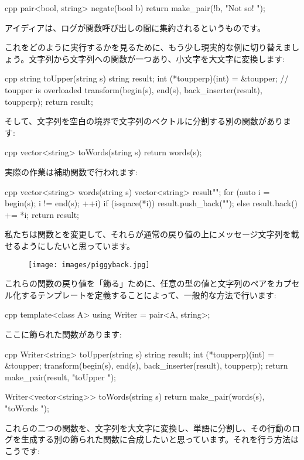 \begin{snip}{cpp}
pair<bool, string> negate(bool b) {
    return make_pair(!b, "Not so! ");
}
\end{snip}
アイディアは、ログが関数呼び出しの間に集約されるというものです。

これをどのように実行するかを見るために、もう少し現実的な例に切り替えましょう。文字列から文字列への関数が一つあり、小文字を大文字に変換します:

\begin{snip}{cpp}
string toUpper(string s) {
    string result;
    int (*toupperp)(int) = &toupper; // toupper is overloaded
    transform(begin(s), end(s), back_inserter(result), toupperp);
    return result;
}
\end{snip}
そして、文字列を空白の境界で文字列のベクトルに分割する別の関数があります:

\begin{snip}{cpp}
vector<string> toWords(string s) {
    return words(s);
}
\end{snip}
実際の作業は補助関数で行われます:

\begin{snip}{cpp}
vector<string> words(string s) {
    vector<string> result{""};
    for (auto i = begin(s); i != end(s); ++i)
    {
        if (isspace(*i))
            result.push_back(""); 
        else
            result.back() += *i;
    }
    return result;
}
\end{snip}
私たちは関数とを変更して、それらが通常の戻り値の上にメッセージ文字列を載せるようにしたいと思っています。

\begin{figure}[H]
  \centering
  \texttt{[image: images/piggyback.jpg]}
\end{figure}
\noindent
これらの関数の戻り値を「飾る」ために、任意の型の値と文字列のペアをカプセル化するテンプレートを定義することによって、一般的な方法で行います:

\begin{snip}{cpp}
template<class A>
using Writer = pair<A, string>;
\end{snip}
ここに飾られた関数があります:

\begin{snip}{cpp}
Writer<string> toUpper(string s) {
    string result;
    int (*toupperp)(int) = &toupper;
    transform(begin(s), end(s), back_inserter(result), toupperp);
    return make_pair(result, "toUpper "); 
}

Writer<vector<string>> toWords(string s) { 
    return make_pair(words(s), "toWords ");
}
\end{snip}
これらの二つの関数を、文字列を大文字に変換し、単語に分割し、その行動のログを生成する別の飾られた関数に合成したいと思っています。それを行う方法はこうです:

